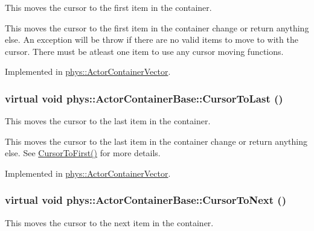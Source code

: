 This moves the cursor to the first item in the container. 

This moves the cursor to the first item in the container change or return anything else. An exception will be throw if there are no valid items to move to with the cursor. There must be atleast one item to use any cursor moving functions. 

Implemented in \hyperlink{classphys_1_1ActorContainerVector_ad9c2eb2a9405dcf687c86745afc9c031}{phys::ActorContainerVector}.

\hypertarget{classphys_1_1ActorContainerBase_afad072e018a04c190e5e5fb93b82b354}{
\subsubsection[{CursorToLast}]{\setlength{\rightskip}{0pt plus 5cm}virtual void phys::ActorContainerBase::CursorToLast ()}}
\label{d1/d00/classphys_1_1ActorContainerBase_afad072e018a04c190e5e5fb93b82b354}


This moves the cursor to the last item in the container. 

This moves the cursor to the last item in the container change or return anything else. See \hyperlink{classphys_1_1ActorContainerBase_ab1a44758d7c17e70ff2e0f8de47424c3}{CursorToFirst()} for more details. 

Implemented in \hyperlink{classphys_1_1ActorContainerVector_aa6b08266bbb57a22c07ab50514e58db4}{phys::ActorContainerVector}.

\hypertarget{classphys_1_1ActorContainerBase_a1aa337456a4e74cb5740dbae08778072}{
\subsubsection[{CursorToNext}]{\setlength{\rightskip}{0pt plus 5cm}virtual void phys::ActorContainerBase::CursorToNext ()}}
\label{d1/d00/classphys_1_1ActorContainerBase_a1aa337456a4e74cb5740dbae08778072}


This moves the cursor to the next item in the container. 

